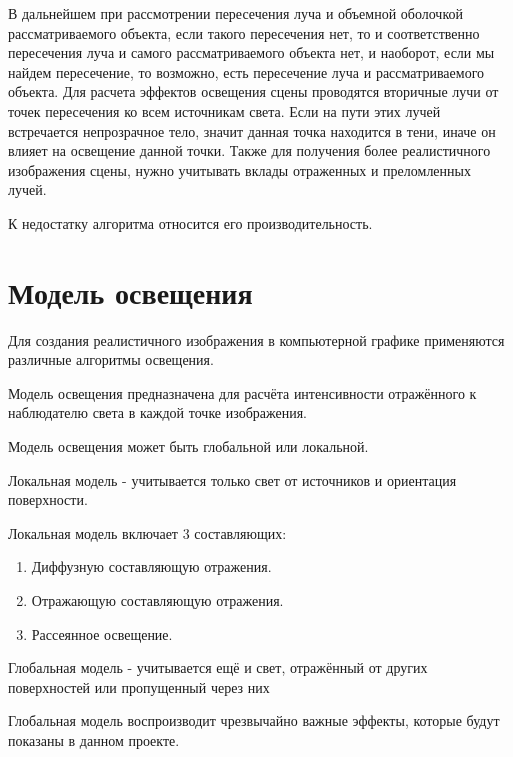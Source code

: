 В дальнейшем при рассмотрении пересечения луча и объемной оболочкой рассматриваемого объекта, если такого пересечения нет, то и соответственно пересечения луча и самого рассматриваемого объекта нет, и наоборот, если мы найдем пересечение, то возможно, есть пересечение луча и рассматриваемого объекта. Для расчета эффектов освещения сцены проводятся вторичные лучи от точек пересечения ко всем источникам света. Если на пути этих лучей встречается непрозрачное тело, значит данная точка находится в тени, иначе он влияет на освещение данной точки. Также для получения более реалистичного изображения сцены, нужно учитывать вклады отраженных и преломленных лучей. 

К недостатку алгоритма относится его производительность. 

\section {Модель освещения}

Для создания реалистичного изображения в компьютерной графике применяются различные алгоритмы освещения.

Модель освещения предназначена для расчёта интенсивности
отражённого к наблюдателю света в каждой точке изображения.

Модель освещения может быть глобальной или локальной.

Локальная модель - учитывается только свет от источников и ориентация поверхности.

Локальная модель включает 3 составляющих: 

\begin{enumerate}
	\item Диффузную составляющую отражения.
	\item Отражающую составляющую отражения.
	\item Рассеянное освещение.
\end{enumerate}

Глобальная модель - учитывается ещё и свет, отражённый от других поверхностей или пропущенный через них

Глобальная модель воспроизводит чрезвычайно важные эффекты, которые будут показаны в данном проекте.


